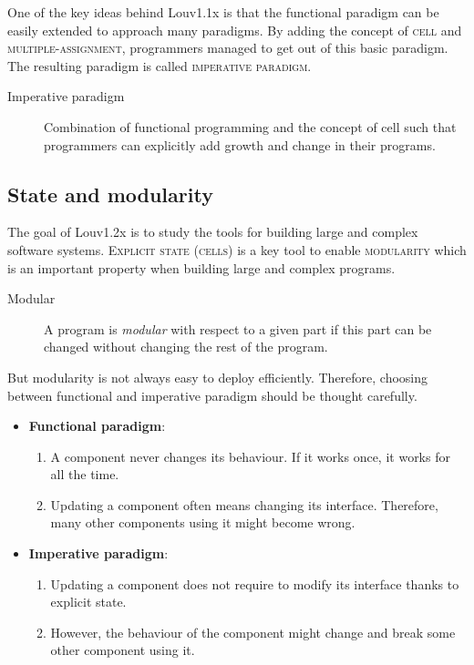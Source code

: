 \documentclass[11pt,a4paper,twoside,openright]{report}
\begin{document}
One of the key ideas behind Louv1.1x is that the functional paradigm can be 
easily extended to approach many paradigms. By adding the concept of 
\textsc{cell} and  \textsc{multiple-assignment}, programmers managed to get out 
of this basic paradigm. The resulting paradigm is called \textsc{imperative 
paradigm}.

\begin{description}
 \item[Imperative paradigm] Combination of functional programming and the 
concept of cell such that programmers can explicitly add growth and change in 
their programs.
\end{description}

\subsection{State and modularity}

The goal of Louv1.2x is to study the tools for building large and complex 
software systems.  \textsc{Explicit state (cells)} is a key tool to enable 
\textsc{modularity} which is an important property when building large and 
complex programs.
\begin{description}
 \item[Modular] A  program is \textit{modular} with respect to a given part if 
this part can be changed without changing the rest of the program.
\end{description}

But modularity is not always easy to deploy efficiently. Therefore, choosing 
between functional and imperative paradigm should be thought carefully.

\begin{itemize}
	\item \textbf{Functional paradigm}: 
	\begin{enumerate}
		\item A component never changes its behaviour. If it works once, 
it works for all the time.
		\item Updating a component often means changing its interface. 
Therefore, many other components using it might become wrong.
	\end{enumerate}
	\item \textbf{Imperative paradigm}:
	\begin{enumerate}
		\item Updating a component does not require to modify its 
interface thanks to explicit state.
		\item However, the behaviour of the component might change and 
break some other component using it.
	\end{enumerate}
\end{itemize}
\end{document}
